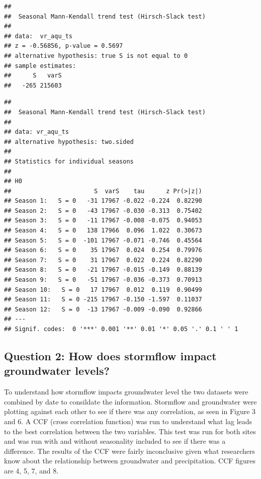 \documentclass[
  12pt,
]{article}
\begin{document}
\begin{verbatim}
## 
##  Seasonal Mann-Kendall trend test (Hirsch-Slack test)
## 
## data:  vr_aqu_ts
## z = -0.56856, p-value = 0.5697
## alternative hypothesis: true S is not equal to 0
## sample estimates:
##      S   varS 
##   -265 215603
\end{verbatim}

\begin{verbatim}
## 
##  Seasonal Mann-Kendall trend test (Hirsch-Slack test)
## 
## data: vr_aqu_ts
## alternative hypothesis: two.sided
## 
## Statistics for individual seasons
## 
## H0
##                       S  varS    tau      z Pr(>|z|)  
## Season 1:   S = 0   -31 17967 -0.022 -0.224  0.82290  
## Season 2:   S = 0   -43 17967 -0.030 -0.313  0.75402  
## Season 3:   S = 0   -11 17967 -0.008 -0.075  0.94053  
## Season 4:   S = 0   138 17966  0.096  1.022  0.30673  
## Season 5:   S = 0  -101 17967 -0.071 -0.746  0.45564  
## Season 6:   S = 0    35 17967  0.024  0.254  0.79976  
## Season 7:   S = 0    31 17967  0.022  0.224  0.82290  
## Season 8:   S = 0   -21 17967 -0.015 -0.149  0.88139  
## Season 9:   S = 0   -51 17967 -0.036 -0.373  0.70913  
## Season 10:   S = 0   17 17967  0.012  0.119  0.90499  
## Season 11:   S = 0 -215 17967 -0.150 -1.597  0.11037  
## Season 12:   S = 0  -13 17967 -0.009 -0.090  0.92866  
## ---
## Signif. codes:  0 '***' 0.001 '**' 0.01 '*' 0.05 '.' 0.1 ' ' 1
\end{verbatim}

\newpage

\hypertarget{question-2-how-does-stormflow-impact-groundwater-levels}{%
\subsection{Question 2: How does stormflow impact groundwater
levels?}\label{question-2-how-does-stormflow-impact-groundwater-levels}}

To understand how stormflow impacts groundwater level the two datasets
were combined by date to consildate the information. Stormflow and
groundwater were plotting against each other to see if there was any
correlation, as seen in Figure 3 and 6. A CCF (cross correlation
function) was run to understand what lag leads to the best correlation
between the two variables. This test was run for both sites and was run
with and without seasonality included to see if there was a difference.
The results of the CCF were fairly inconclusive given what researchers
know about the relationship between groundwater and precipitation. CCF
figures are 4, 5, 7, and 8.
\end{document}
